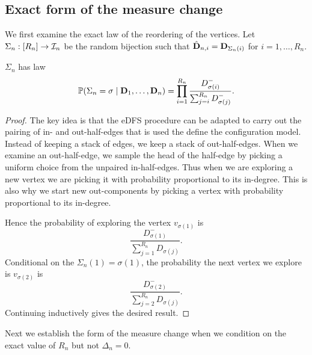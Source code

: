 \subsection{Exact form of the measure change}

We first examine the exact law of the reordering of the vertices. Let $\Sigma_n: [R_n] \to {\mathcal I}_n$ be the random bijection such that $\hat{{\mathbf D}}_{n, i} = {\mathbf D}_{\Sigma_n(i)}$ for $i = 1, \ldots, R_n$.

\begin{lemma}
    $\Sigma_n$ has law
    \begin{equation*}
        {\mathbb P}(\Sigma_n = \sigma \mid {\mathbf D}_1, \ldots, {\mathbf D}_n)
        = \prod_{i=1}^{R_n} \frac{D^-_{\sigma(i)}}{\sum_{j=i}^{R_n} D^-_{\sigma(j)}}.
    \end{equation*}
\end{lemma}
\begin{proof}
    The key idea is that the eDFS procedure can be adapted to carry out the pairing of in- and out-half-edges that is used the define the configuration model. Instead of keeping a stack of edges, we keep a stack of out-half-edges. When we examine an out-half-edge, we sample the head of the half-edge by picking a uniform choice from the unpaired in-half-edges. Thus when we are exploring a new vertex we are picking it with probability proportional to its in-degree. This is also why we start new out-components by picking a vertex with probability proportional to its in-degree.

    Hence the probability of exploring the vertex $v_{\sigma(1)}$ is
    \begin{equation*}
        \frac{D_{\sigma(1)}^{-}}{\sum_{j=1}^{R_n} D_{\sigma(j)}}.
    \end{equation*}
    Conditional on the $\Sigma_n(1) = \sigma(1)$, the probability the next vertex we explore is $v_{\sigma(2)}$ is
    \begin{equation*}
        \frac{D_{\sigma(2)}^{-}}{\sum_{j=2}^{R_n} D_{\sigma(j)}}.
    \end{equation*}
    Continuing inductively gives the desired result.
\end{proof}

Next we establish the form of the measure change when we condition on the exact value of $R_n$ but not $\Delta_n = 0$.

